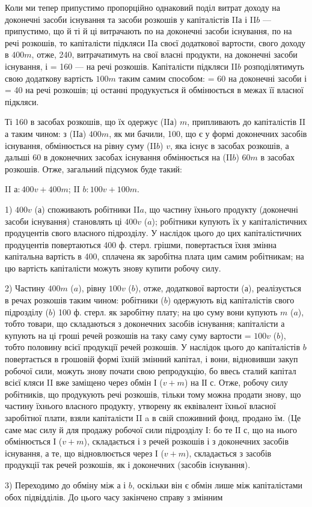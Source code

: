 Коли ми тепер припустимо пропорційно однаковий поділ витрат
доходу на доконечні засоби існування та засоби розкошів у капіталістів
II$а$ і II$b$ — припустимо, що й ті й ці витрачають по  на доконечні
засоби існування, по  на речі розкошів, то капіталісти підкляси II$а$
 своєї додаткової вартости, свого доходу в $400 m$, отже, 240, витрачатимуть
на свої власні продукти, на доконечні засоби існування, і
 = 160 — на речі розкошів. Капіталісти підкляси II$b$ розподілятимуть
свою додаткову вартість $100 m$ таким самим способом:  = 60 на доконечні
засоби і  = 40 на речі розкошів; ці останні продукується й
обмінюється в межах її власної підкляси.

Ті 160 в засобах розкошів, що їх одержує (II$а$) $m$, припливають до
капіталістів II а таким чином: з (II$а$) $400 m$, як ми бачили, 100, що є у
формі доконечних засобів існування, обмінюється на рівну суму (II$b$) $v$,
яка існує в засобах розкошів, а дальші 60 в доконечних засобах існування
обмінюється на (II$b$) $60 m$ в засобах розкошів. Отже, загальний
підсумок буде такий:

II $а: 400 v + 400 m$; II $b : 100 v + 100 m$.

1) $400 v$ ($а$) споживають робітники II$a$, що частину їхнього продукту
(доконечні засоби існування) становлять ці $400 v$ ($a$); робітники купують
їх у капіталістичних продуцентів свого власного підрозділу. У наслідок
цього до цих капіталістичних продуцентів повертаються 400 ф. стерл.
грішми, повертається їхня змінна капітальна вартість в 400, сплачена як
заробітна плата цим самим робітникам; на цю вартість капіталісти можуть
знову купити робочу силу.

2) Частину $400 m$ ($a$), рівну $100 v$ ($b$), отже,  додаткової вартости ($а$),
реалізується в речах розкошів таким чином: робітники ($b$) одержують від
капіталістів свого підрозділу ($b$) 100 ф. стерл. як заробітну плату; на
цю суму вони купують $m$ ($a$), тобто товари, що складаються з доконечних
засобів існування; капіталісти $а$ купують на ці гроші речей
розкошів на таку саму суму вартости = $100 v$ ($b$), тобто половину всієї
продукції речей розкошів. У наслідок цього до капіталістів $b$ повертається
в грошовій формі їхній змінний капітал, і вони, відновивши закуп
робочої сили, можуть знову почати свою репродукцію, бо ввесь сталий
капітал всієї кляси II вже заміщено через обмін І ($v + m$) на ІІ $с$. Отже,
робочу силу робітників, що продукують речі розкошів, тільки тому
можна продати знову, що частину їхнього власного продукту, утворену
як еквівалент їхньої власної заробітної плати, взяли капіталісти II a в
свій споживний фонд, продано їм. (Це саме має силу й для продажу робочої
сили підрозділу І: бо те ІІ $с$, що на нього обмінюється І ($v + m$), складається
і з речей розкошів і з доконечних засобів існування, а те, що
відновлюється через І ($v + m$), складається з засобів продукції так речей
розкошів, як і доконечних (засобів існування).

3) Переходимо до обміну між $а$ і $b$, оскільки він є обмін лише між
капіталістами обох підвідділів. До цього часу закінчено справу з змінним
\parbreak{}  %
